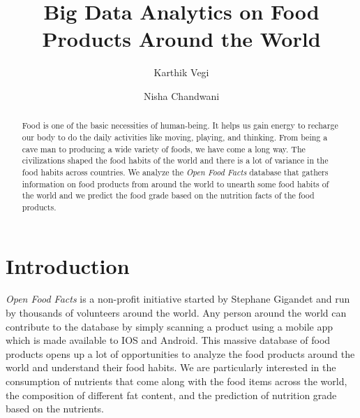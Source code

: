 \documentclass[sigconf]{acmart}
\begin{document}
\title{Big Data Analytics on Food Products Around the World}

\author{Karthik Vegi}

\author{Nisha Chandwani}

\renewcommand{\shortauthors}{kvegi, nchandwa}

\begin{abstract}
Food is one of the basic necessities of human-being. It helps us gain energy to recharge our body to do the daily activities like moving, playing, and thinking. From being a cave man to producing a wide variety of foods, we have come a long way. The civilizations shaped the food habits of the world and there is a lot of variance in the food habits across countries. We analyze the {\em Open Food Facts} database that gathers information on food products from around the world to unearth some food habits of the world and we predict the food grade based on the nutrition facts of the food products.
\end{abstract}


\maketitle

\section{Introduction}
{\em Open Food Facts} is a non-profit initiative started by Stephane Gigandet and run by thousands of volunteers around the world. Any person around the world can contribute to the database by simply scanning a product using a mobile app which is made available to IOS and Android. This massive database of food products opens up a lot of opportunities to analyze the food products around the world and understand their food habits. We are particularly interested in the consumption of nutrients that come along with the food items across the world, the composition of different fat content, and the prediction of nutrition grade based on the nutrients.
\end{document}
